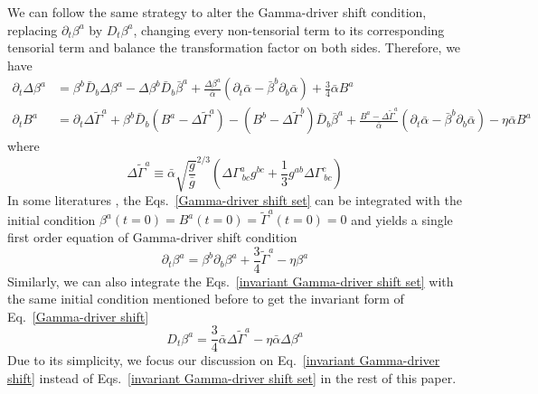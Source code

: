 \documentclass[letterpaper,nofootinbib,prd,amsmath,onecolumn]{revtex4-1}
\begin{document}
We can follow the same strategy to alter the Gamma-driver shift condition, replacing $\partial_{t}\beta^{a}$ by $D_{t}\beta^{a}$, changing every non-tensorial term to its corresponding tensorial term and balance the transformation factor on both sides. Therefore, we have
\begin{subequations}\label{invariant Gamma-driver shift set}
\begin{align}
\partial_{t}\Delta \beta^{a} & = \beta^{b}{\bar D}_{b}\Delta\beta^{a} - \Delta \beta^{b}{\bar D}_{b}{\bar \beta}^{a} + \frac{\Delta\beta^{a}}{{\bar \alpha}}(\partial_{t}{\bar \alpha} - {\bar \beta}^{b}\partial_{b}{\bar \alpha}) + \frac{3}{4}{\bar \alpha}B^{a}\\
\partial_{t}B^{a} & = \partial_{t}\Delta {\tilde \Gamma}^{a} + \beta^{b}{\bar D}_{b}(B^{a} - \Delta{\tilde \Gamma}^{a}) - (B^{b} - \Delta{\tilde \Gamma}^{b}){\bar D}_{b}{\bar \beta}^{a} + \frac{B^{a} - \Delta{\tilde \Gamma}^{a}}{{\bar \alpha}}(\partial_{t}{\bar \alpha} - {\bar \beta}^{b}\partial_{b}{\bar \alpha}) - \eta{\bar \alpha}B^{a}
\end{align}
\end{subequations}
where
\begin{equation}
\Delta {\tilde \Gamma}^{a} \equiv {\bar \alpha}\sqrt{\frac{g}{{\bar g}}}^{2/3}\left(\Delta \Gamma^{a}_{~bc}g^{bc} + \frac{1}{3}g^{ab}\Delta \Gamma^{c}_{~bc}\right)
\end{equation}
In some literatures \cite{vanMeter:2006vi}, the Eqs.~\ref{Gamma-driver shift set} can be integrated with the initial condition $\beta^{a}(t=0) = B^{a}(t=0) = {\tilde \Gamma}^{a}(t = 0) = 0$ and yields a single first order equation of Gamma-driver shift condition
\begin{equation}\label{Gamma-driver shift}
\partial_{t}\beta^{a} = \beta^{b}\partial_{b}\beta^{a} + \frac{3}{4}{\tilde \Gamma}^{a} - \eta \beta^{a}
\end{equation} 
Similarly, we can also integrate the Eqs.~\ref{invariant Gamma-driver shift set} with the same initial condition mentioned before to get the invariant form of Eq.~\ref{Gamma-driver shift}
\begin{equation}\label{invariant Gamma-driver shift}
D_{t}\beta^{a} = \frac{3}{4}{\bar \alpha}\Delta {\tilde \Gamma}^{a} - \eta {\bar \alpha}\Delta\beta^{a}
\end{equation}
Due to its simplicity, we focus our discussion on Eq.~\ref{invariant Gamma-driver shift} instead of Eqs.~\ref{invariant Gamma-driver shift set} in the rest of this paper.
\end{document}
